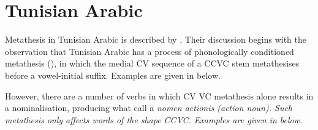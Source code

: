 
\section{Tunisian Arabic}\label{sec:TunAra}
Metathesis in Tunisian Arabic is described by \cite{kidr86}.
Their discussion begins with the observation that Tunisian Arabic has a process of
phonologically conditioned metathesis (),
in which the medial CV sequence of a CCVC stem metathesises
before a vowel-initial suffix.
Examples are given in  below.

\begin{exe}
	\label{ex:TunAraMorMet}
\end{exe}

However, there are a number of verbs in which CV {\ra} VC metathesis
alone results in a nominalisation, producing what \citeauthor{kidr86}
call a \it{nomen actionis} (action noun).
Such metathesis only affects words of the shape CCVC.
Examples are given in  below.

\begin{exe}
	\label{ex:TunAraDerMet}
\end{exe}


